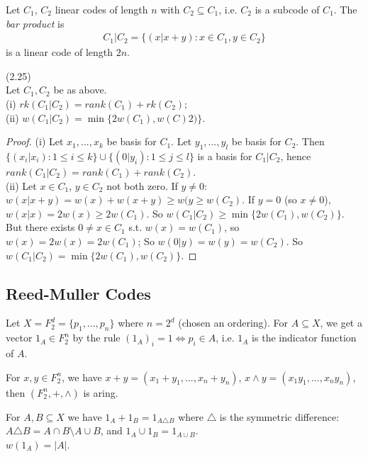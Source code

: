 \documentclass[a4paper]{article}
\begin{document}
\begin{defi}
Let $C_1$, $C_2$ linear codes of length $n$ with $C_2 \subseteq C_1$, i.e. $C_2$ is a subcode of $C_1$. The \emph{bar product} is 
\begin{equation*}
\begin{aligned}
C_1 | C_2 = \{(x|x+y): x \in C_1, y \in C_2\}
\end{aligned}
\end{equation*}
is a linear code of length $2n$.

\begin{lemma} (2.25)\\
Let $C_1,C_2$ be as above.\\
(i) $rk (C_1|C_2) = rank(C_1)+rk(C_2)$;\\
(ii) $w(C_1|C_2) = \min \{2w(C_1),w(C)2)\}$.
\begin{proof}
(i) Let $x_1,...,x_k$ be basis for $C_1$. Let $y_1,...,y_l$ be basis for $C_2$. Then $\{(x_i|x_i) : 1 \leq i \leq k\} \cup \{(0 | y_i): 1 \leq j \leq l\}$ is a basis for $C_1 | C_2$, hence $rank(C_1|C_2) = rank(C_1)+rank(C_2)$.\\
(ii) Let $x \in C_1$, $y \in C_2$ not both zero. If $y \neq 0$: $w(x|x+y) = w(x)+w(x+y) \geq w(y \geq w(C_2)$. If $y=0$ (so $x \neq 0$), $w(x|x) = 2w(x) \geq 2w(C_1)$. So $w(C_1|C_2) \geq \min \{2w(C_1),w(C_2)\}$. But there exists $0 \neq x \in C_1$ s.t. $w(x) = w(C_1)$, so $w(x) = 2w(x) = 2w(C_1)$; So $w(0|y) = w(y) = w(C_2)$. So $w(C_1|C_2) = \min\{2w(C_1), w(C_2)\}$.
\end{proof}
\end{lemma}
\end{defi}

\subsection{Reed-Muller Codes}
Let $X = F_2^d = \{p_1,...,p_n\}$ where $n=2^d$ (chosen an ordering). For $A \subseteq X$, we get a vector $1_A \in F_2^n$ by the rule $(1_A)_i = 1 \iff p_i \in A$, i.e. $1_A$ is the indicator function of $A$.

For $x,y \in F_2^n$, we have $x+y = (x_1+y_1,...,x_n+y_n)$, $x \wedge y = (x_1y_1,...,x_ny_n)$, then $(F_2^n,+,\wedge)$ is aring.

For $A,B \subseteq X$ we have $1_A+1_B = 1_{A \triangle B}$ where $\triangle$ is the symmetric difference: $A \triangle B = A \cap B \setminus A \cup B$, and $1_A \cup 1_B = 1_{A \cup B}$.\\
$w(1_A) = |A|$.
\end{document}
